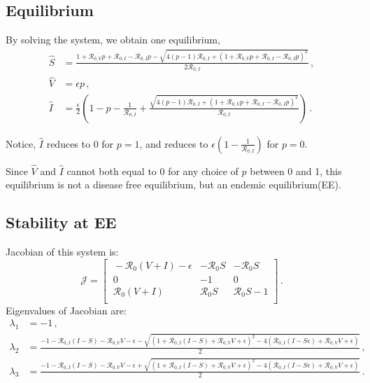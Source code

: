 \documentclass[12pt]{article}
\newcommand{\R}{\mathcal{R}}
\begin{document}
\subsection{Equilibrium}

By solving the system, we obtain one equilibrium,
\begin{subequations}
\begin{align}
\hat{S}&=\frac{1+\R_{0,V}p+\R_{0,I}-\R_{0,I}p-\sqrt{4(p-1)\R_{0,I}+(1+\R_{0,V}p+\R_{0,I}-\R_{0,I}p)^2}}{2\R_{0,I}}\,,\\ \label{Shat}
\hat{V}&=\epsilon p\,,\\
\hat{I}&=\frac{\epsilon}{2}(1-p-\frac{1}{\R_{0,I}}+\frac{\sqrt{4(p-1)\R_{0,I}+(1+\R_{0,V}p+\R_{0,I}-\R_{0,I}p)^2}}{\R_{0,I}})\,.
\end{align}
\end{subequations}

Notice, $\hat{I}$ reduces to 0 for $p=1$, and reduces to $\epsilon(1-\frac{1}{\R_{0,I}})$ for $p=0$.

Since $\hat{V}$ and $\hat{I}$ cannot both equal to 0 for any choice of $p$ between 0 and 1, this equilibrium is not a disease free equilibrium, but an endemic equilibrium(EE).
\subsection{Stability at EE}
Jacobian of this system is:
\begin{equation}
\mathcal{J} =
\begin{bmatrix}
    \ -\R_0 (V+I)-\epsilon       & -\R_0 S     &-\R_0 S\\
    \ 0       & -1    &0\\
    \ \R_0 (V+I)       &\R_0 S     &\R_0 S-1\\
\end{bmatrix}\,.
\end{equation}
Eigenvalues of Jacobian are:
\begin{subequations}
\begin{align}
\lambda_1&=-1\,,\\ \label{lam2}
\lambda_2&=\frac{-1-\R_{0,I}(I-S)-\R_{0,V}V-\epsilon-\sqrt{(1+\R_{0,I}(I-S)+\R_{0,V}V+\epsilon)^2-4(\R_{0,I}(I-S\epsilon)+\R_{0,V}V+\epsilon)}}{2}\,,\\ \label{lam3}
\lambda_3&=\frac{-1-\R_{0,I}(I-S)-\R_{0,V}V-\epsilon+\sqrt{(1+\R_{0,I}(I-S)+\R_{0,V}V+\epsilon)^2-4(\R_{0,I}(I-S\epsilon)+\R_{0,V}V+\epsilon)}}{2}\,.
\end{align}
\end{subequations}
\end{document}
